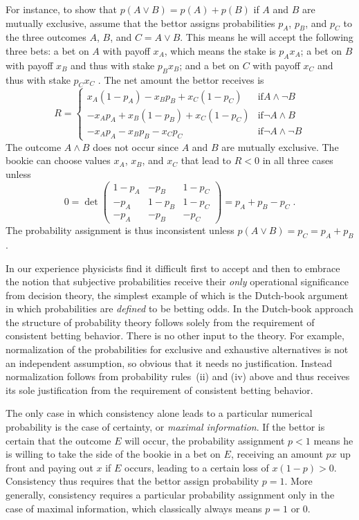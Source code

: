 \documentclass[aps,12pt]{revtex4}
\begin{document}
For instance, to show that $p(A\vee B)=p(A)+p(B)$ if $A$ and $B$ are
mutually exclusive, assume that the bettor assigns probabilities
$p_A$, $p_B$, and $p_C$ to the three outcomes $A$, $B$, and $C=A\vee
B$. This means he will accept the following three bets: a bet on $A$
with payoff $x_A$, which means the stake is $p_Ax_A$; a bet on $B$
with payoff $x_B$ and thus with stake $p_Bx_B$; and a bet on $C$ with
payoff $x_C$ and thus with stake $p_Cx_C$ . The net amount the
bettor receives is
\begin{equation}
 R  = 
 \begin{cases}
x_A(1-p_A) -x_Bp_B + x_C(1-p_C)          & \mbox{if} A\wedge\neg B \\
-x_Ap_A + x_B(1-p_B) + x_C(1-p_C)    & \mbox{if} \neg A\wedge B \\
-x_Ap_A -x_Bp_B -x_Cp_C              & \mbox{if} \neg A\wedge\neg B
\end{cases}
\end{equation}
The outcome $A\wedge B$ does not occur since $A$ and $B$ are mutually
exclusive. The bookie can choose values $x_A$, $x_B$, and $x_C$
that lead to $R<0$ in all three cases unless
\begin{equation}
0=\det
\begin{pmatrix}
1-p_A &  -p_B &  1-p_C \\
 -p_A & 1-p_B &  1-p_C \\
 -p_A &  -p_B &   -p_C
\end{pmatrix}
= p_A+p_B-p_C \;.
\end{equation}
The probability assignment is thus inconsistent unless
$p(A\vee B)=p_C=p_A+p_B$.

In our experience physicists find it difficult first to accept and
then to embrace the notion that subjective probabilities receive
their {\it only\/} operational significance from decision theory, the
simplest example of which is the Dutch-book argument in which
probabilities are {\it defined\/} to be betting odds.  In the
Dutch-book approach the structure of probability theory follows
solely from the requirement of consistent betting behavior.  There is
no other input to the theory.  For example, normalization of the
probabilities for exclusive and exhaustive alternatives is not an
independent assumption, so obvious that it needs no justification.
Instead normalization follows from probability rules~(ii) and (iv)
above and thus receives its sole justification from the requirement
of consistent betting behavior.

The only case in which consistency alone leads to a particular
numerical probability is the case of certainty, or {\it maximal
information}.  If the bettor is certain that the outcome $E$ will
occur, the probability assignment $p<1$ means he is willing to take
the side of the bookie in a bet on $E$, receiving an amount $px$ up
front and paying out $x$ if $E$ occurs, leading to a certain loss of
$x(1-p)>0$.  Consistency thus requires that the bettor assign
probability $p=1$.  More generally, consistency requires a particular
probability assignment only in the case of maximal information, which
classically always means $p=1$ or 0.
\end{document}
